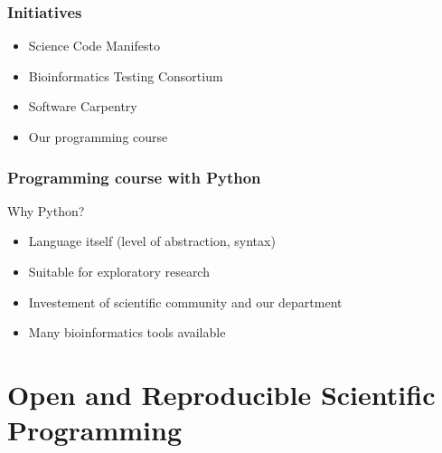 \documentclass[slidestop]{beamer}
\begin{document}
\begin{frame}
  \frametitle{Initiatives}
  \begin{itemize}
    \item Science Code Manifesto
    \item Bioinformatics Testing Consortium
    \item Software Carpentry
    \item Our programming course
  \end{itemize}
\end{frame}

{
  \frame{}
}

\begin{frame}
  \frametitle{Programming course with Python}
  Why Python?
  \begin{itemize}
    \item Language itself (level of abstraction, syntax)
    \item Suitable for exploratory research
    \item Investement of scientific community and our department
    \item Many bioinformatics tools available
  \end{itemize}
\end{frame}

\section*{Open and Reproducible Scientific Programming}
\end{document}
